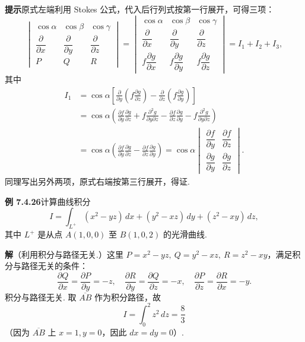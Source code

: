 \documentclass[UTF8, 12pt, fontset=fandol, oneside]{ctexart}
\begin{document}
\noindent\textbf{提示}\quad 原式左端利用 Stokes 公式，代入后行列式按第一行展开，可得三项：
\[
\begin{vmatrix}
\cos\alpha & \cos\beta & \cos\gamma\\
\dfrac{\partial}{\partial x} & \dfrac{\partial}{\partial y} & \dfrac{\partial}{\partial z}\\
P & Q & R
\end{vmatrix}
=
\begin{vmatrix}
\cos\alpha & \cos\beta & \cos\gamma\\
\dfrac{\partial}{\partial x} & \dfrac{\partial}{\partial y} & \dfrac{\partial}{\partial z}\\
f\dfrac{\partial g}{\partial x} & f\dfrac{\partial g}{\partial y} & f\dfrac{\partial g}{\partial z}
\end{vmatrix}
=I_1+I_2+I_3,
\]
其中
\[
\begin{aligned}
I_1&=\cos\alpha\left[\frac{\partial}{\partial y}\left(f\frac{\partial g}{\partial z}\right)
-\frac{\partial}{\partial z}\left(f\frac{\partial g}{\partial y}\right)\right]\\
&=\cos\alpha\left(\frac{\partial f}{\partial y}\frac{\partial g}{\partial z}
+f\frac{\partial^2g}{\partial y\partial z}
-\frac{\partial f}{\partial z}\frac{\partial g}{\partial y}
-f\frac{\partial^2g}{\partial y\partial z}\right)\\
&=\cos\alpha\left(\frac{\partial f}{\partial y}\frac{\partial g}{\partial z}
-\frac{\partial f}{\partial z}\frac{\partial g}{\partial y}\right)
=\cos\alpha
\begin{vmatrix}
\dfrac{\partial f}{\partial y} & \dfrac{\partial f}{\partial z}\\
\dfrac{\partial g}{\partial y} & \dfrac{\partial g}{\partial z}
\end{vmatrix}.
\end{aligned}
\]
同理写出另外两项，原式右端按第三行展开，得证.

\noindent\textbf{例 7.4.26}\quad 计算曲线积分
\[
I=\int_{L^+}(x^2-yz)\,dx+(y^2-xz)\,dy+(z^2-xy)\,dz,
\]
其中 $L^+$ 是从点 $A(1,0,0)$ 至 $B(1,0,2)$ 的光滑曲线.

\noindent\textbf{解}\quad （利用积分与路径无关.）这里 $P=x^2-yz,\ Q=y^2-xz,\ R=z^2-xy$，满足积分与路径无关的条件：
\[
\frac{\partial Q}{\partial x}=\frac{\partial P}{\partial y}=-z,\quad
\frac{\partial R}{\partial y}=\frac{\partial Q}{\partial z}=-x,\quad
\frac{\partial P}{\partial z}=\frac{\partial R}{\partial x}=-y.
\]
积分与路径无关. 取 $\overline{AB}$ 作为积分路径，故
\[
I=\int_0^2z^2\,dz=\frac83
\]
（因为 $\overline{AB}$ 上 $x=1,y=0$，因此 $dx=dy=0$）.
\end{document}
